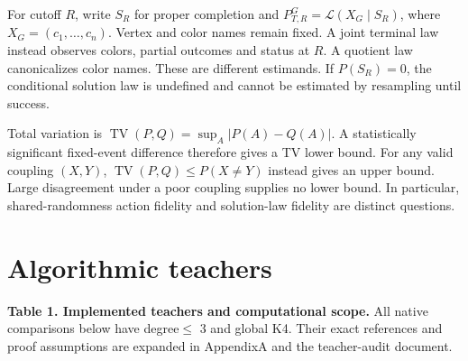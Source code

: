 \documentclass[
  11pt,
]{article}
\begin{document}
For cutoff \(R\), write \(S_R\) for proper completion and
\(P_{T,R}^G=\mathcal L(X_G\mid S_R)\), where \(X_G=(c_1,\ldots,c_n)\).
Vertex and color names remain fixed. A joint terminal law instead
observes colors, partial outcomes and status at \(R\). A quotient law
canonicalizes color names. These are different estimands. If
\(P(S_R)=0\), the conditional solution law is undefined and cannot be
estimated by resampling until success.

Total variation is \(\operatorname{TV}(P,Q)=\sup_A|P(A)-Q(A)|\). A
statistically significant fixed-event difference therefore gives a TV
lower bound. For any valid coupling \((X,Y)\),
\(\operatorname{TV}(P,Q)\le P(X\ne Y)\) instead gives an upper bound.
Large disagreement under a poor coupling supplies no lower bound. In
particular, shared-randomness action fidelity and solution-law fidelity
are distinct questions.

\section{Algorithmic teachers}\label{algorithmic-teachers}

\textbf{Table 1. Implemented teachers and computational scope.} All
native comparisons below have degree\(\le\) 3 and global K4. Their exact
references and proof assumptions are expanded in AppendixA and the
teacher-audit document.
\end{document}
